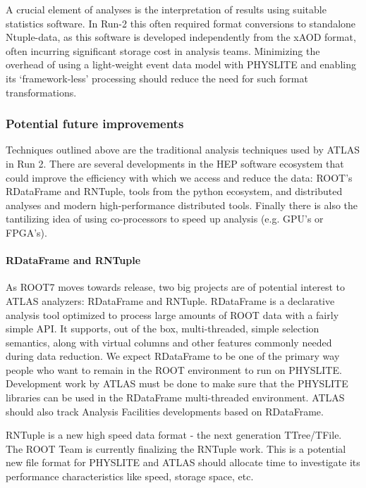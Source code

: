A crucial element of analyses is the interpretation of results using suitable statistics software. In Run-2 this often required format conversions to standalone Ntuple-data, as this software is developed independently from the xAOD format, often incurring significant storage cost in analysis teams. Minimizing the overhead of using a light-weight event data model with {\sc PHYSLITE} and enabling its `framework-less' processing should reduce the need for such format transformations.

\subsubsection{Potential future improvements}

Techniques outlined above are the traditional analysis techniques used by ATLAS in Run 2. There are several developments in the HEP software ecosystem that could improve the efficiency with which we access and reduce the data: ROOT's RDataFrame and RNTuple, tools from the python ecosystem, and distributed analyses and modern high-performance distributed tools. Finally there is also the tantilizing idea of using co-processors to speed up analysis (e.g. GPU's or FPGA's).

\paragraph{RDataFrame and RNTuple}

As ROOT7 moves towards release, two big projects are of potential interest to ATLAS analyzers: RDataFrame and RNTuple. RDataFrame is a declarative analysis tool optimized to process large amounts of ROOT data with a fairly simple API. It supports, out of the box, multi-threaded, simple selection semantics, along with virtual columns and other features commonly needed during data reduction. We expect RDataFrame to be one of the primary way people who want to remain in the ROOT environment to run on PHYSLITE. Development work by ATLAS must be done to make sure that the PHYSLITE libraries can be used in the RDataFrame multi-threaded environment. ATLAS should also track Analysis Facilities developments based on RDataFrame.

RNTuple is a new high speed data format - the next generation TTree/TFile. The ROOT Team is currently finalizing the RNTuple work. This is a potential new file format for PHYSLITE and ATLAS should allocate time to investigate its performance characteristics like speed, storage space, etc.

